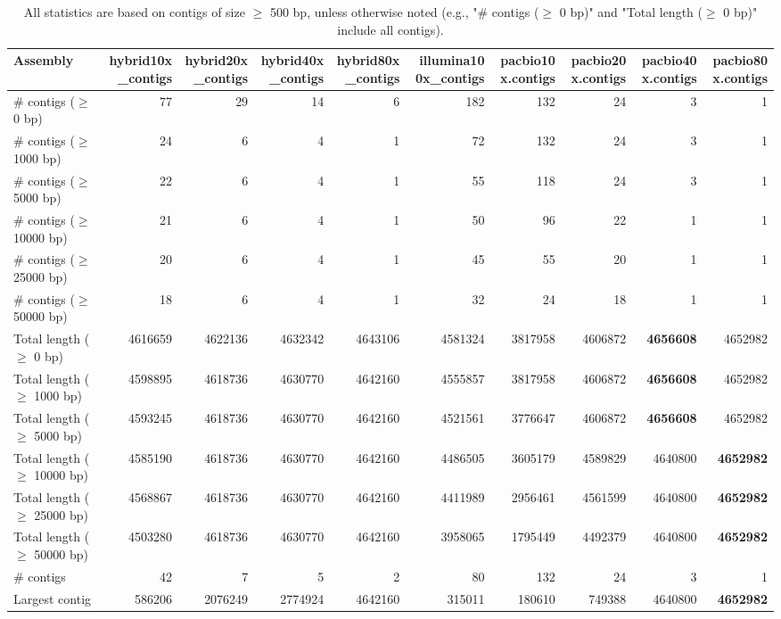\documentclass[12pt,a4paper]{article}
\begin{document}
\begin{table}[ht]
\begin{center}
\caption{All statistics are based on contigs of size $\geq$ 500 bp, unless otherwise noted (e.g., "\# contigs ($\geq$ 0 bp)" and "Total length ($\geq$ 0 bp)" include all contigs).}
\begin{tabular}{|l*{9}{|r}|}
\hline
Assembly & hybrid10x\_contigs & hybrid20x\_contigs & hybrid40x\_contigs & hybrid80x\_contigs & illumina100x\_contigs & pacbio10x.contigs & pacbio20x.contigs & pacbio40x.contigs & pacbio80x.contigs \\ \hline
\# contigs ($\geq$ 0 bp) & 77 & 29 & 14 & 6 & 182 & 132 & 24 & 3 & 1 \\ \hline
\# contigs ($\geq$ 1000 bp) & 24 & 6 & 4 & 1 & 72 & 132 & 24 & 3 & 1 \\ \hline
\# contigs ($\geq$ 5000 bp) & 22 & 6 & 4 & 1 & 55 & 118 & 24 & 3 & 1 \\ \hline
\# contigs ($\geq$ 10000 bp) & 21 & 6 & 4 & 1 & 50 & 96 & 22 & 1 & 1 \\ \hline
\# contigs ($\geq$ 25000 bp) & 20 & 6 & 4 & 1 & 45 & 55 & 20 & 1 & 1 \\ \hline
\# contigs ($\geq$ 50000 bp) & 18 & 6 & 4 & 1 & 32 & 24 & 18 & 1 & 1 \\ \hline
Total length ($\geq$ 0 bp) & 4616659 & 4622136 & 4632342 & 4643106 & 4581324 & 3817958 & 4606872 & {\bf 4656608} & 4652982 \\ \hline
Total length ($\geq$ 1000 bp) & 4598895 & 4618736 & 4630770 & 4642160 & 4555857 & 3817958 & 4606872 & {\bf 4656608} & 4652982 \\ \hline
Total length ($\geq$ 5000 bp) & 4593245 & 4618736 & 4630770 & 4642160 & 4521561 & 3776647 & 4606872 & {\bf 4656608} & 4652982 \\ \hline
Total length ($\geq$ 10000 bp) & 4585190 & 4618736 & 4630770 & 4642160 & 4486505 & 3605179 & 4589829 & 4640800 & {\bf 4652982} \\ \hline
Total length ($\geq$ 25000 bp) & 4568867 & 4618736 & 4630770 & 4642160 & 4411989 & 2956461 & 4561599 & 4640800 & {\bf 4652982} \\ \hline
Total length ($\geq$ 50000 bp) & 4503280 & 4618736 & 4630770 & 4642160 & 3958065 & 1795449 & 4492379 & 4640800 & {\bf 4652982} \\ \hline
\# contigs & 42 & 7 & 5 & 2 & 80 & 132 & 24 & 3 & 1 \\ \hline
Largest contig & 586206 & 2076249 & 2774924 & 4642160 & 315011 & 180610 & 749388 & 4640800 & {\bf 4652982} \\ \hline

\end{tabular}
\end{center}
\end{table}
\end{document}
